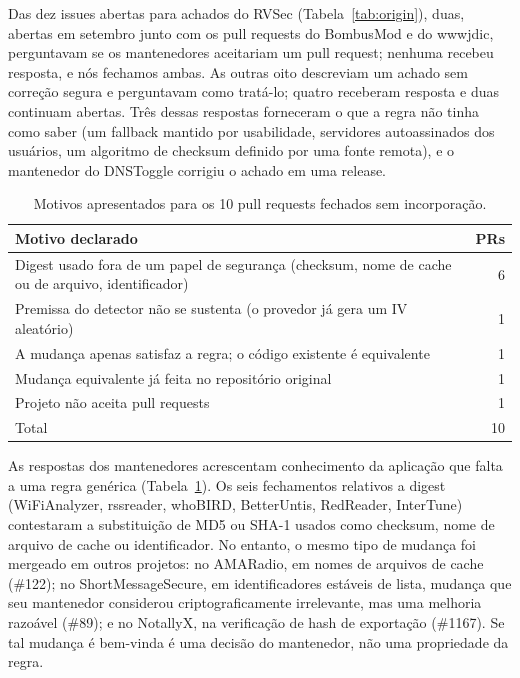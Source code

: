 \documentclass[conference]{IEEEtran}
\begin{document}
Das dez issues abertas para achados do RVSec (Tabela~\ref{tab:origin}), duas,
abertas em setembro junto com
os pull requests do BombusMod e do wwwjdic, perguntavam se os mantenedores aceitariam
um pull request; nenhuma recebeu resposta, e nós fechamos ambas. As outras
oito descreviam um achado sem correção segura e perguntavam como tratá-lo; quatro
receberam resposta e duas continuam abertas. Três dessas respostas forneceram o que
a regra não tinha como saber (um fallback mantido por usabilidade, servidores
autoassinados dos usuários, um algoritmo de checksum definido por uma fonte remota), e o mantenedor do DNSToggle
corrigiu o achado em uma release.

\begin{table}[H]
\centering
\caption{Motivos apresentados para os 10 pull requests fechados sem
incorporação.}
\label{tab:closures}
\footnotesize
\begin{tabular}{p{5.8cm}r}
\toprule
Motivo declarado & PRs \\
\midrule
Digest usado fora de um papel de segurança (checksum, nome de cache ou de arquivo,
identificador) & 6 \\
Premissa do detector não se sustenta (o provedor já gera um IV aleatório) & 1 \\
A mudança apenas satisfaz a regra; o código existente é equivalente & 1 \\
Mudança equivalente já feita no repositório original & 1 \\
Projeto não aceita pull requests & 1 \\
\midrule
Total & 10 \\
\bottomrule
\end{tabular}
\end{table}

As respostas dos mantenedores acrescentam conhecimento da aplicação que falta a uma regra genérica
(Tabela~\ref{tab:closures}). Os seis fechamentos relativos a digest (WiFiAnalyzer, rssreader,
whoBIRD, BetterUntis, RedReader, InterTune) contestaram a substituição de MD5 ou SHA-1
usados como checksum, nome de arquivo de cache ou identificador. No entanto, o mesmo tipo de
mudança foi mergeado em outros projetos: no AMARadio, em nomes de arquivos de cache (\#122);
no ShortMessageSecure, em identificadores estáveis de lista, mudança que seu mantenedor considerou
criptograficamente irrelevante, mas uma melhoria razoável (\#89); e no NotallyX,
na verificação de hash de exportação (\#1167). Se tal mudança é bem-vinda é uma
decisão do mantenedor, não uma propriedade da regra.
\end{document}
